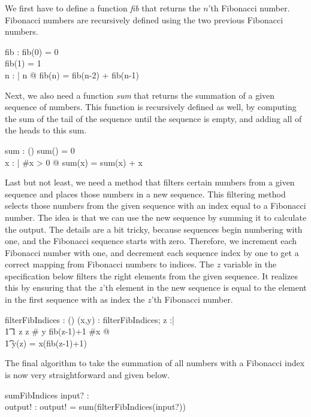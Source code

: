 \documentclass[12pt]{article}
\begin{document}
We first have to define a function \textit{fib} that returns the $n$'th Fibonacci number. Fibonacci numbers are recursively defined using the two previous Fibonacci numbers.
\begin{axdef}
fib : \nat \fun \nat
\where
fib(0) = 0 \\
fib(1) = 1 \\
\forall n : \nat | n  @ fib(n) = fib(n-2) + fib(n-1)
\end{axdef}

Next, we also need a function \textit{sum} that returns the summation of a given sequence of numbers. This function is recursively defined as well, by computing the sum of the tail of the sequence until the sequence is empty, and adding all of the heads to this sum.
\begin{axdef}
sum : \power (\seq \real \fun \real)
\where
sum(\langle\rangle) = 0 \\
\forall x : \seq \real | \#x > 0 @ sum(x) = sum(\tail x) + \head x
\end{axdef}

Last but not least, we need a method that filters certain numbers from a given sequence and places those numbers in a new sequence. This filtering method selects those numbers from the given sequence with an index equal to a Fibonacci number. The idea is that we can use the new sequence by summing it to calculate the output. The details are a bit tricky, because sequences begin numbering with one, and the Fibonacci sequence starts with zero. Therefore, we increment each Fibonacci number with one, and decrement each sequence index by one to get a correct mapping from Fibonacci numbers to indices. The $z$ variable in the specification below filters the right elements from the given sequence. It realizes this by ensuring that the $z$'th element in the new sequence is equal to the element in the first sequence with as index the $z$'th Fibonacci number.
\begin{axdef}
filterFibIndices : \power (\seq \real \fun \seq \real)
\where
\forall (x,y) : filterFibIndices; z :\nat | \\
\t1 1 \leq z \wedge z \leq \# y \wedge fib(z-1)+1 \leq \#x @ \\
\t1 y(z) = x(fib(z-1)+1)
\end{axdef}

The final algorithm to take the summation of all numbers with a Fibonacci index is now very straightforward and given below.
\begin{schema}{sumFibIndices}
input? : \seq \real \\
output! : \real
\where
output! = sum(filterFibIndices(input?))
\end{schema}
\end{document}
